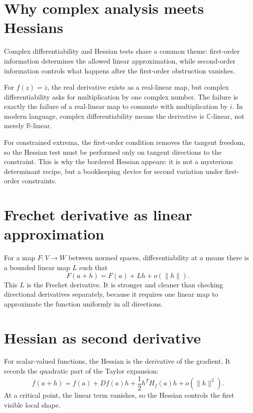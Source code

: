 \section{Why complex analysis meets Hessians}

Complex differentiability and Hessian tests share a common theme: first-order information determines the allowed linear approximation, while second-order information controls what happens after the first-order obstruction vanishes.

For \(f(z)=\overline z\), the real derivative exists as a real-linear map, but complex differentiability asks for multiplication by one complex number.  The failure is exactly the failure of a real-linear map to commute with multiplication by \(i\).  In modern language, complex differentiability means the derivative is \(\mathbb C\)-linear, not merely \(\mathbb R\)-linear.

For constrained extrema, the first-order condition removes the tangent freedom, so the Hessian test must be performed only on tangent directions to the constraint.  This is why the bordered Hessian appears: it is not a mysterious determinant recipe, but a bookkeeping device for second variation under first-order constraints.


\section{Frechet derivative as linear approximation}

For a map \(F:V\to W\) between normed spaces, differentiability at \(a\) means there is a bounded linear map \(L\) such that
\[
  F(a+h)=F(a)+Lh+o(\|h\|).
\]
This \(L\) is the Frechet derivative.  It is stronger and cleaner than checking directional derivatives separately, because it requires one linear map to approximate the function uniformly in all directions.

\section{Hessian as second derivative}

For scalar-valued functions, the Hessian is the derivative of the gradient.  It records the quadratic part of the Taylor expansion:
\[
  f(a+h)=f(a)+Df(a)h+\frac12 h^T H_f(a)h+o(\|h\|^2).
\]
At a critical point, the linear term vanishes, so the Hessian controls the first visible local shape.
